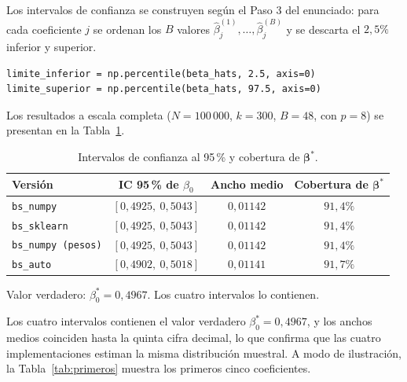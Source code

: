 \documentclass[11pt,letterpaper]{article}
\begin{document}
Los intervalos de confianza se construyen según el Paso 3 del enunciado: para cada
coeficiente $j$ se ordenan los $B$ valores $\hat{\beta}^{(1)}_j, \dots, \hat{\beta}^{(B)}_j$
y se descarta el $2{,}5\%$ inferior y superior.

\begin{lstlisting}[caption={Construcción del intervalo de confianza al 95\%.}]
limite_inferior = np.percentile(beta_hats, 2.5, axis=0)
limite_superior = np.percentile(beta_hats, 97.5, axis=0)
\end{lstlisting}

Los resultados a escala completa ($N = 100\,000$, $k = 300$, $B = 48$, con $p = 8$) se
presentan en la Tabla~\ref{tab:cobertura}.

\begin{table}[H]
\centering
\caption{Intervalos de confianza al 95\,\% y cobertura de $\boldsymbol{\beta}^*$.}
\label{tab:cobertura}
\small
\begin{tabular}{lccc}
\toprule
\textbf{Versión} & \textbf{IC 95\,\% de $\beta_0$} & \textbf{Ancho medio} & \textbf{Cobertura de $\boldsymbol{\beta}^*$} \\
\midrule
\texttt{bs\_numpy}          & $[0{,}4925,\ 0{,}5043]$ & $0{,}01142$ & $91{,}4\%$ \\
\texttt{bs\_sklearn}        & $[0{,}4925,\ 0{,}5043]$ & $0{,}01142$ & $91{,}4\%$ \\
\texttt{bs\_numpy (pesos)}  & $[0{,}4925,\ 0{,}5043]$ & $0{,}01142$ & $91{,}4\%$ \\
\texttt{bs\_auto}           & $[0{,}4902,\ 0{,}5018]$ & $0{,}01141$ & $91{,}7\%$ \\
\bottomrule
\end{tabular}
\par\vspace{2pt}
\footnotesize Valor verdadero: $\beta_0^* = 0{,}4967$. Los cuatro intervalos lo contienen.
\end{table}

Los cuatro intervalos contienen el valor verdadero $\beta_0^* = 0{,}4967$, y los anchos
medios coinciden hasta la quinta cifra decimal, lo que confirma que las cuatro
implementaciones estiman la misma distribución muestral. A modo de ilustración, la
Tabla~\ref{tab:primeros} muestra los primeros cinco coeficientes.
\end{document}
